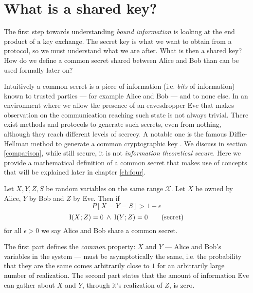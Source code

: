 \section{What is a shared key?}
	The first step towards understanding \emph{bound information} is looking at the end product of a key exchange. 
	The secret key is what we want to obtain from a protocol, so we must understand what we are after.
	What is then a shared key? 
	How do we define a common secret shared between Alice and Bob than can be used formally later on? 
    	
Intuitively a common secret is a piece of information (i.e. \textit{bits} of information) known to trusted parties --- for example Alice and Bob --- and to none else. 
In an environment where we allow the presence of an eavesdropper Eve that makes observation on the communication reaching such state is not always trivial. 
There exist methods and protocols to generate such secrets, even from nothing, although they reach different levels of secrecy. A notable one is the famous Diffie-Hellman method to generate a common cryptographic key \cite{DH76} . 
We discuss in section \ref{comparison}, while still secure, it is not \textit{information theoretical secure}.
Here we provide a mathematical definition of a common secret that makes use of concepts that will be explained later in chapter \ref{ch:four}.
    	\begin{definition}
	Let $X,Y,Z,S$ be random variables on the same range $\mathcal{X}$. Let $X$ be owned by Alice, $Y$ by Bob and $Z$ by Eve. Then if
  \begin{equation} \label{eq:common}
	  P[X=Y=S] > 1 - \epsilon \tag{common}
	\end{equation}
	\begin{equation} \label{eq:secret}
	  \operatorname{I}(X;Z) = 0 \: \wedge \: \operatorname{I}(Y;Z) = 0 \tag{secret}
  \end{equation}
for all $\epsilon > 0 $ we say Alice and Bob share a common secret.
    	\end{definition}
The first part defines the \textit{common} property: $X$ and $Y$ --- Alice and Bob's variables in the system --- must be asymptotically the same, i.e. the probability that they are the same comes arbitrarily close to $1$ for an arbitrarily large number of realization.
The second part states that the amount of information Eve can gather about $X$ and $Y$, through it's realization of $Z$, is zero.

